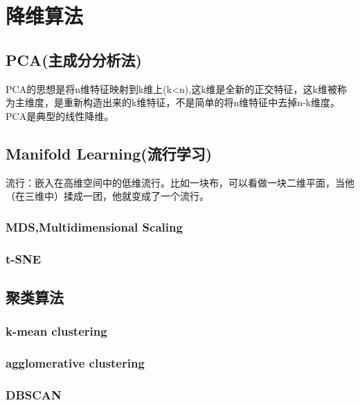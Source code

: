 \documentclass[16pt,UTF8]{ctexart}
\begin{document}
\LARGE

\section{降维算法}
\subsection{PCA(主成分分析法)}	
PCA的思想是将n维特征映射到k维上(k<n),这k维是全新的正交特征，这k维被称为主维度，是重新构造出来的k维特征，不是简单的将n维特征中去掉n-k维度。
\indent PCA是典型的线性降维。

\subsection{Manifold Learning(流行学习)}
\indent 流行：嵌入在高维空间中的低维流行。比如一块布，可以看做一块二维平面，当他（在三维中）揉成一团，他就变成了一个流行。
\subsubsection{MDS,Multidimensional Scaling}


\subsubsection{t-SNE}

\subsection{聚类算法}
\subsubsection{k-mean clustering}
\subsubsection{agglomerative clustering}
\subsubsection{DBSCAN}
\end{document}
